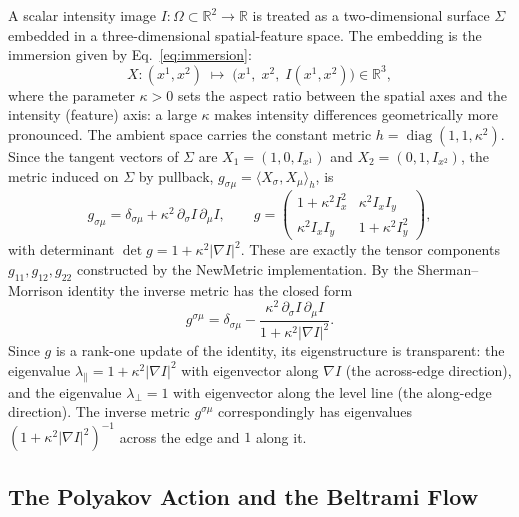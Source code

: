 \documentclass[11pt,a4paper]{article}
\begin{document}
A scalar intensity image $I:\Omega\subset\mathbb{R}^2\to\mathbb{R}$ is treated as a
two-dimensional surface $\Sigma$ embedded in a three-dimensional spatial-feature
space. The embedding is the immersion given by Eq.~\eqref{eq:immersion}:
\begin{equation}
X:(x^1,x^2)\;\longmapsto\;\big(x^1,\;x^2,\;I(x^1,x^2)\big)\in\mathbb{R}^3,
\label{eq:immersion}
\end{equation}
where the parameter $\kappa>0$ sets the aspect ratio between the spatial axes and
the intensity (feature) axis: a large $\kappa$ makes intensity differences
geometrically more pronounced. The ambient space carries the constant metric
$h=\operatorname{diag}(1,1,\kappa^2)$. Since the tangent vectors of $\Sigma$ are
$X_1=(1,0,I_{x^1})$ and $X_2=(0,1,I_{x^2})$, the metric induced on $\Sigma$ by
pullback, $g_{\sigma\mu}=\langle X_\sigma,X_\mu\rangle_h$, is
\begin{equation}
g_{\sigma\mu}=\delta_{\sigma\mu}+\kappa^2\,\partial_\sigma I\,\partial_\mu I,\qquad
g=\begin{pmatrix} 1+\kappa^2 I_x^2 & \kappa^2 I_x I_y\\[2pt] \kappa^2 I_x I_y & 1+\kappa^2 I_y^2\end{pmatrix},
\label{eq:induced-metric}
\end{equation}
with determinant $\det g=1+\kappa^2|\nabla I|^2$. These are exactly the tensor
components $g_{11},g_{12},g_{22}$ constructed by the NewMetric implementation. By
the Sherman--Morrison identity the inverse metric has the closed form
\begin{equation}
g^{\sigma\mu}=\delta_{\sigma\mu}-\frac{\kappa^2\,\partial_\sigma I\,\partial_\mu I}{1+\kappa^2|\nabla I|^2}.
\label{eq:inverse-metric}
\end{equation}
Since $g$ is a rank-one update of the identity, its eigenstructure is transparent:
the eigenvalue $\lambda_\parallel=1+\kappa^2|\nabla I|^2$ with eigenvector along
$\nabla I$ (the across-edge direction), and the eigenvalue $\lambda_\perp=1$ with
eigenvector along the level line (the along-edge direction). The inverse metric
$g^{\sigma\mu}$ correspondingly has eigenvalues $(1+\kappa^2|\nabla I|^2)^{-1}$
across the edge and $1$ along it.

\subsection{The Polyakov Action and the Beltrami Flow}\label{sec:theory-polyakov}
\end{document}

